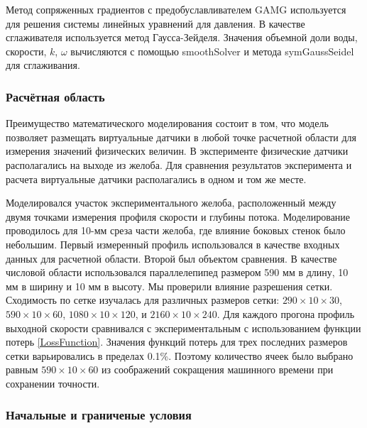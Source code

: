 \documentclass[mathematics,article,accept,pdftex,moreauthors]{Definitions/mdpi}
\begin{document}
%

Метод сопряженных градиентов с предобуславливателем GAMG используется для решения системы линейных уравнений для давления. В качестве сглаживателя используется метод Гаусса-Зейделя. Значения объемной доли воды, скорости, $k$, $\omega$ вычисляются с помощью smoothSolver и метода symGaussSeidel для сглаживания.

\subsubsection{Расчётная область}

Преимущество математического моделирования состоит в том, что модель позволяет размещать виртуальные датчики в любой точке расчетной области для измерения значений физических величин. В эксперименте физические датчики располагались на выходе из желоба. Для сравнения результатов эксперимента и расчета виртуальные датчики располагались в одном и том же месте.

Моделировался участок экспериментального желоба, расположенный между двумя точками измерения профиля скорости и глубины потока.
Моделирование проводилось для 10-мм среза части желоба, где влияние боковых стенок было небольшим.
Первый измеренный профиль использовался в качестве входных данных для расчетной области. Второй был объектом сравнения. 
%
В качестве числовой области использовался параллелепипед размером 590 мм в длину, 10 мм в ширину и 10 мм в высоту.
%
Мы проверили влияние разрешения сетки. Сходимость по сетке изучалась для различных размеров сетки: $290 \times 10 \times 30$, $590 \times 10 \times 60$, $1080 \times 10 \times 120$, и $2160 \times 10 \times 240$. Для каждого прогона профиль выходной скорости сравнивался с экспериментальным с использованием функции потерь \eqref{LossFunction}. Значения функций потерь для трех последних размеров сетки варьировались в пределах 0.1\%. Поэтому количество ячеек было выбрано равным $590 \times 10 \times 60$ из соображений сокращения машинного времени при сохранении точности.

\subsubsection{Начальные и граниченые условия}
\end{document}
